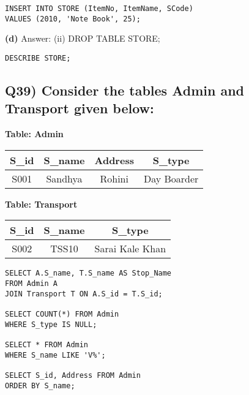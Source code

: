 \documentclass{article}
\begin{document}
\begin{lstlisting}
INSERT INTO STORE (ItemNo, ItemName, SCode) 
VALUES (2010, 'Note Book', 25);
\end{lstlisting}

\textbf{(d)} Answer: (ii) DROP TABLE STORE;

\begin{lstlisting}
DESCRIBE STORE;
\end{lstlisting}

\subsection*{Q39) Consider the tables Admin and Transport given below:}

\textbf{Table: Admin}
\begin{center}
\begin{tabular}{|c|c|c|c|}
\hline
S\_id & S\_name & Address & S\_type \\
\hline
S001 & Sandhya & Rohini & Day Boarder \\
\hline
\end{tabular}
\end{center}

\textbf{Table: Transport}
\begin{center}
\begin{tabular}{|c|c|c|}
\hline
S\_id & S\_name & S\_type \\
\hline
S002 & TSS10 & Sarai Kale Khan \\
\hline
\end{tabular}
\end{center}

\begin{lstlisting}
SELECT A.S_name, T.S_name AS Stop_Name 
FROM Admin A 
JOIN Transport T ON A.S_id = T.S_id;

SELECT COUNT(*) FROM Admin 
WHERE S_type IS NULL;

SELECT * FROM Admin 
WHERE S_name LIKE 'V%';

SELECT S_id, Address FROM Admin 
ORDER BY S_name;
\end{lstlisting}
\end{document}
